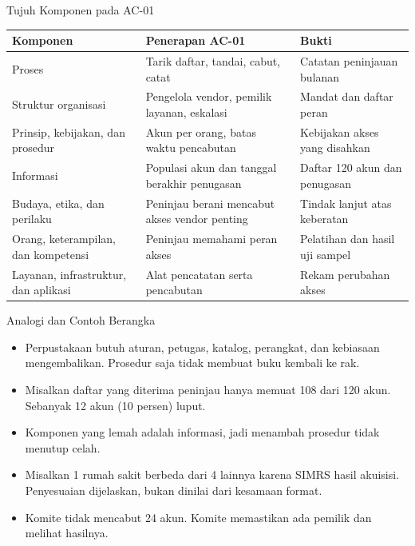 \documentclass[aspectratio=169, table, 12pt]{beamer}
\begin{document}
\begin{frame}{{\Large Tujuh Komponen pada AC-01}}
  \vspace{2pt}
  \scriptsize
  \begin{tabularx}{\textwidth}{|>{\raggedright\arraybackslash}p{}|>{\raggedright\arraybackslash}X|>{\raggedright\arraybackslash}X|}
    \hline
    \textbf{Komponen} & \textbf{Penerapan AC-01} & \textbf{Bukti} \\ \hline
    Proses & Tarik daftar, tandai, cabut, catat & Catatan peninjauan bulanan \\ \hline
    Struktur organisasi & Pengelola vendor, pemilik layanan, eskalasi & Mandat dan daftar peran \\ \hline
    Prinsip, kebijakan, dan prosedur & Akun per orang, batas waktu pencabutan & Kebijakan akses yang disahkan \\ \hline
    Informasi & Populasi akun dan tanggal berakhir penugasan & Daftar 120 akun dan penugasan \\ \hline
    Budaya, etika, dan perilaku & Peninjau berani mencabut akses vendor penting & Tindak lanjut atas keberatan \\ \hline
    Orang, keterampilan, dan kompetensi & Peninjau memahami peran akses & Pelatihan dan hasil uji sampel \\ \hline
    Layanan, infrastruktur, dan aplikasi & Alat pencatatan serta pencabutan & Rekam perubahan akses \\ \hline
  \end{tabularx}
\end{frame}

\begin{frame}{{\Large Analogi dan Contoh Berangka}}
  \vspace{4pt}
  \small
  \begin{itemize}
    \item Perpustakaan butuh aturan, petugas, katalog, perangkat, dan kebiasaan mengembalikan. Prosedur saja tidak
          membuat buku kembali ke rak.
    \item Misalkan daftar yang diterima peninjau hanya memuat 108 dari 120 akun. Sebanyak 12 akun (10 persen) luput.
    \item Komponen yang lemah adalah informasi, jadi menambah prosedur tidak menutup celah.
    \item Misalkan 1 rumah sakit berbeda dari 4 lainnya karena SIMRS hasil akuisisi. Penyesuaian dijelaskan, bukan
          dinilai dari kesamaan format.
    \item Komite tidak mencabut 24 akun. Komite memastikan ada pemilik dan melihat hasilnya.
  \end{itemize}
\end{frame}
\end{document}

